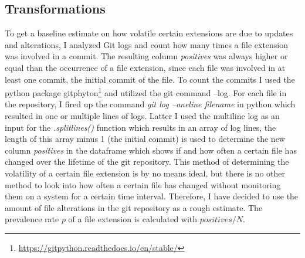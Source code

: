 \subsection{Transformations}
To get a baseline estimate on how volatile certain extensions are due to updates and alterations, I analyzed Git logs and count how many times a file extension was involved in a commit. The resulting column \textit{positives} was always higher or equal than the occurrence of a file extension, since each file was involved in at least one commit, the initial commit of the file. To count the commits I used the python package gitphyton\footnote{\url{https://gitpython.readthedocs.io/en/stable/}} and utilized the git command --log. For each file in the repository, I fired up the command \textit{git log --oneline filename} in python which resulted in one or multiple lines of logs. Latter I used the multiline log as an input for the \textit{.splitlines()} function which results in an array of log lines, the length of this array minus 1 (the initial commit) is used to determine the new column \textit{positives} in the dataframe which shows if and how often a certain file has changed over the lifetime of the git repository. 
This method of determining the volatility of a certain file extension is by no means ideal, but there is no other method to look into how often a certain file has changed without monitoring them on a system for a certain time interval. Therefore, I have decided to use the amount of file alterations in the git repository as a rough estimate.
The prevalence rate $p$ of a file extension is calculated with $positives/N$.

